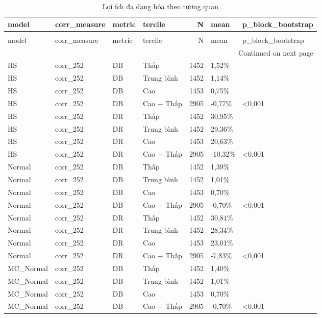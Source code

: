 \begin{longtable}{llllrll}
\caption{Lợi ích đa dạng hóa theo tương quan} \label{tab:T8_diversification_by_corr} \\
\toprule
model & corr\_measure & metric & tercile & N & mean & p\_block\_bootstrap \\
\midrule
\endfirsthead
\caption[]{Lợi ích đa dạng hóa theo tương quan} \\
\toprule
model & corr\_measure & metric & tercile & N & mean & p\_block\_bootstrap \\
\midrule
\endhead
\midrule
\multicolumn{7}{r}{Continued on next page} \\
\midrule
\endfoot
\bottomrule
\endlastfoot
HS & corr\_252 & DB & Thấp & 1452 & 1,52\% &  \\
HS & corr\_252 & DB & Trung bình & 1452 & 1,14\% &  \\
HS & corr\_252 & DB & Cao & 1453 & 0,75\% &  \\
HS & corr\_252 & DB & Cao − Thấp & 2905 & -0,77\% & <0,001 \\
HS & corr\_252 & DR & Thấp & 1452 & 30,95\% &  \\
HS & corr\_252 & DR & Trung bình & 1452 & 29,36\% &  \\
HS & corr\_252 & DR & Cao & 1453 & 20,63\% &  \\
HS & corr\_252 & DR & Cao − Thấp & 2905 & -10,32\% & <0,001 \\
Normal & corr\_252 & DB & Thấp & 1452 & 1,39\% &  \\
Normal & corr\_252 & DB & Trung bình & 1452 & 1,01\% &  \\
Normal & corr\_252 & DB & Cao & 1453 & 0,70\% &  \\
Normal & corr\_252 & DB & Cao − Thấp & 2905 & -0,70\% & <0,001 \\
Normal & corr\_252 & DR & Thấp & 1452 & 30,84\% &  \\
Normal & corr\_252 & DR & Trung bình & 1452 & 28,34\% &  \\
Normal & corr\_252 & DR & Cao & 1453 & 23,01\% &  \\
Normal & corr\_252 & DR & Cao − Thấp & 2905 & -7,83\% & <0,001 \\
MC\_Normal & corr\_252 & DB & Thấp & 1452 & 1,40\% &  \\
MC\_Normal & corr\_252 & DB & Trung bình & 1452 & 1,01\% &  \\
MC\_Normal & corr\_252 & DB & Cao & 1453 & 0,70\% &  \\
MC\_Normal & corr\_252 & DB & Cao − Thấp & 2905 & -0,70\% & <0,001 \\

\end{longtable}
